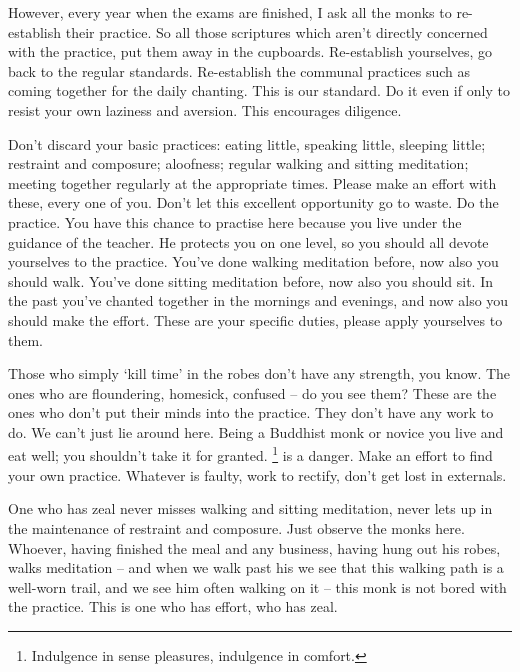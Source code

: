 However, every year when the exams are finished, I ask all the monks to re-establish their practice. So all those scriptures which aren't directly concerned with the practice, put them away in the cupboards. Re-establish yourselves, go back to the regular standards. Re-establish the communal practices such as coming together for the daily chanting. This is our standard. Do it even if only to resist your own laziness and aversion. This encourages diligence.

Don't discard your basic practices: eating little, speaking little, sleeping little; restraint and composure; aloofness; regular walking and sitting meditation; meeting together regularly at the appropriate times. Please make an effort with these, every one of you. Don't let this excellent opportunity go to waste. Do the practice. You have this chance to practise here because you live under the guidance of the teacher. He protects you on one level, so you should all devote yourselves to the practice. You've done walking meditation before, now also you should walk. You've done sitting meditation before, now also you should sit. In the past you've chanted together in the mornings and evenings, and now also you should make the effort. These are your specific duties, please apply yourselves to them.

Those who simply `kill time' in the robes don't have any strength, you know. The ones who are floundering, homesick, confused -- do you see them? These are the ones who don't put their minds into the practice. They don't have any work to do. We can't just lie around here. Being a Buddhist monk or novice you live and eat well; you shouldn't take it for granted. \footnote{Indulgence in sense pleasures, indulgence in comfort.} is a danger. Make an effort to find your own practice. Whatever is faulty, work to rectify, don't get lost in externals.

One who has zeal never misses walking and sitting meditation, never lets up in the maintenance of restraint and composure. Just observe the monks here. Whoever, having finished the meal and any business, having hung out his robes, walks meditation -- and when we walk past his  we see that this walking path is a well-worn trail, and we see him often walking on it -- this monk is not bored with the practice. This is one who has effort, who has zeal.

